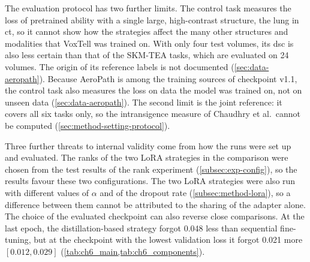 The evaluation protocol has two further limits.
The control task measures the loss of pretrained ability with a single large, high-contrast structure, the lung in \gls{ct}, so it cannot show how the strategies affect the many other structures and modalities that VoxTell was trained on.
With only four test volumes, its \gls{dsc} is also less certain than that of the SKM-TEA tasks, which are evaluated on 24 volumes.
The origin of its reference labels is not documented (\cref{sec:data-aeropath}).
Because AeroPath is among the training sources of checkpoint v1.1, the control task also measures the loss on data the model was trained on, not on unseen data (\cref{sec:data-aeropath}).
The second limit is the joint reference: it covers all six tasks only, so the intransigence measure of Chaudhry et al.\ cannot be computed (\cref{sec:method-setting-protocol}).

Three further threats to internal validity come from how the runs were set up and evaluated.
The ranks of the two LoRA strategies in the comparison were chosen from the test results of the rank experiment (\cref{subsec:exp-config}), so the results favour these two configurations.
The two LoRA strategies were also run with different values of $\alpha$ and of the dropout rate (\cref{subsec:method-lora}), so a difference between them cannot be attributed to the sharing of the adapter alone.
The choice of the evaluated checkpoint can also reverse close comparisons.
At the last epoch, the distillation-based strategy forgot 0.048 less than sequential fine-tuning, but at the checkpoint with the lowest validation loss it forgot 0.021 more $[0.012, 0.029]$ (\cref{tab:ch6_main,tab:ch6_components}).

